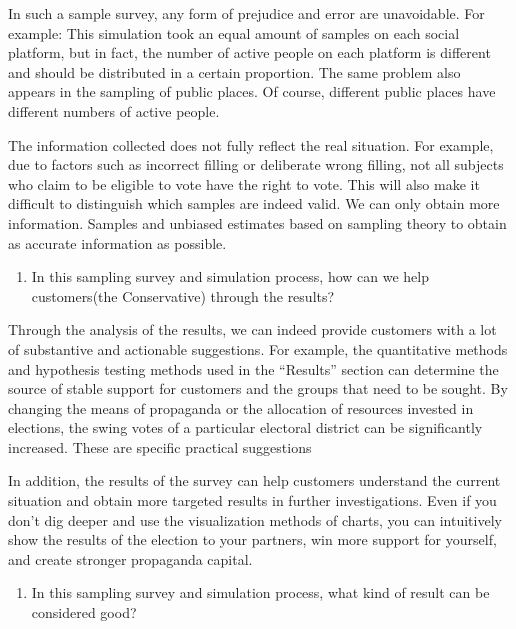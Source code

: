 \documentclass[
]{article}
\providecommand{\tightlist}{%
  \setlength{\itemsep}{0pt}\setlength{\parskip}{0pt}}
\begin{document}
In such a sample survey, any form of prejudice and error are
unavoidable. For example: This simulation took an equal amount of
samples on each social platform, but in fact, the number of active
people on each platform is different and should be distributed in a
certain proportion. The same problem also appears in the sampling of
public places. Of course, different public places have different numbers
of active people.

The information collected does not fully reflect the real situation. For
example, due to factors such as incorrect filling or deliberate wrong
filling, not all subjects who claim to be eligible to vote have the
right to vote. This will also make it difficult to distinguish which
samples are indeed valid. We can only obtain more information. Samples
and unbiased estimates based on sampling theory to obtain as accurate
information as possible.

\begin{enumerate}
\def\labelenumi{\arabic{enumi}.}
\setcounter{enumi}{1}
\tightlist
\item
  In this sampling survey and simulation process, how can we help
  customers(the Conservative) through the results?
\end{enumerate}

Through the analysis of the results, we can indeed provide customers
with a lot of substantive and actionable suggestions. For example, the
quantitative methods and hypothesis testing methods used in the
``Results'' section can determine the source of stable support for
customers and the groups that need to be sought. By changing the means
of propaganda or the allocation of resources invested in elections, the
swing votes of a particular electoral district can be significantly
increased. These are specific practical suggestions

In addition, the results of the survey can help customers understand the
current situation and obtain more targeted results in further
investigations. Even if you don't dig deeper and use the visualization
methods of charts, you can intuitively show the results of the election
to your partners, win more support for yourself, and create stronger
propaganda capital.

\begin{enumerate}
\def\labelenumi{\arabic{enumi}.}
\setcounter{enumi}{2}
\tightlist
\item
  In this sampling survey and simulation process, what kind of result
  can be considered good?
\end{enumerate}
\end{document}
